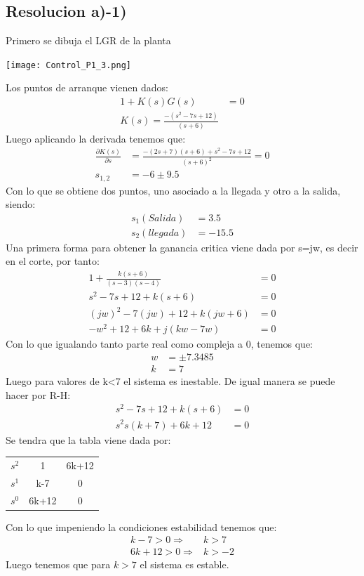 \documentclass[
  11pt,
  letterpaper,
   addpoints,
   answers
  ]{exam}
\begin{document}
\begin{questions}
\begin{solution}
\subsection*{Resolucion a)-1)}
Primero se dibuja el LGR de la planta
\begin{center}
    \texttt{[image: Control\_P1\_3.png]}
\end{center}
Los puntos de arranque vienen dados:
\begin{align}
    1+K(s)G(s) &= 0\\
    K(s) = \frac{-(s^{2}-7s+12)}{(s+6)}
\end{align}
Luego aplicando la derivada tenemos que:
\begin{align}
    \frac{\partial K(s)}{\partial s} &= \frac{-(2s+7)(s+6)+s^{2}-7s+12}{(s+6)^{2}}=0\\
    s_{1,2} &= -6 \pm 9.5
\end{align}
Con lo que se obtiene dos puntos, uno asociado a la llegada y otro a la salida, siendo:
\begin{align}
    s_{1}(Salida) &= 3.5\\
    s_{2}(llegada) &= -15.5
\end{align}
Una primera forma para obtener la ganancia critica viene dada por s=jw, es decir en el corte, por tanto:
\begin{align}
    1+ \frac{k(s+6)}{(s-3)(s-4)}&=0\\
    s^{2}-7s +12 +k(s+6)&=0\\
    (jw)^{2} -7(jw) + 12 + k(jw+6) &=0\\
    -w^{2} +12 +6k + j(kw-7w) &=0
\end{align}
Con lo que igualando tanto parte real como compleja a 0, tenemos que:
\begin{align}
    w &= \pm 7.3485\\
    k &= 7
\end{align}
Luego para valores de k<7 el sistema es inestable. De igual manera se puede hacer por R-H:
\begin{align}
    s^{2} -7s +12 + k(s+6) &=0\\
    s^{2} s(k+7) +6k+12 &= 0
\end{align} 
Se tendra que la tabla viene dada por:
\begin{center}
    \begin{tabular}{|c|cc|}
        \hline
        $s^{2}$ & 1 & 6k+12\\
        $s^{1}$ & k-7 & 0\\
        $s^{0}$ & 6k+12 & 0\\
        \hline
    \end{tabular}
\end{center}
Con lo que impeniendo la condiciones estabilidad tenemos que:
\begin{align}
    k-7 > 0    \Rightarrow& k>7 \\
    6k+12 > 0  \Rightarrow& k>-2
\end{align}
Luego tenemos que para $k > 7$ el sistema es estable.

\end{solution}
\end{questions}
\end{document}
